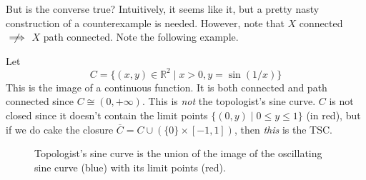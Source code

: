   But is the converse true? Intuitively, it seems like it, but a pretty nasty construction of a counterexample is needed. However, note that $X$ connected $\centernot\implies$ $X$ path connected. Note the following example. 

  \begin{example}
    Let 
    \begin{equation}
      C = \{ (x, y) \in \mathbb{R}^2 \mid x > 0, y = \sin(1/x) \}
    \end{equation} 
    This is the image of a continuous function. It is both connected and path connected since $C \cong (0, +\infty)$. This is \textit{not} the topologist's sine curve. $C$ is not closed since it doesn't contain the limit points $\{(0, y) \mid 0 \leq y \leq 1 \}$ (in red), but if we do cake the closure $\overline{C} = C \cup (\{0\} \times [-1, 1])$, then \textit{this} is the TSC. 

    \begin{figure}[H]
      \centering 
      \caption{Topologist's sine curve is the union of the image of the oscillating sine curve (blue) with its limit points (red).} 
      \label{fig:top_sine_curve}
    \end{figure}


\end{example}
